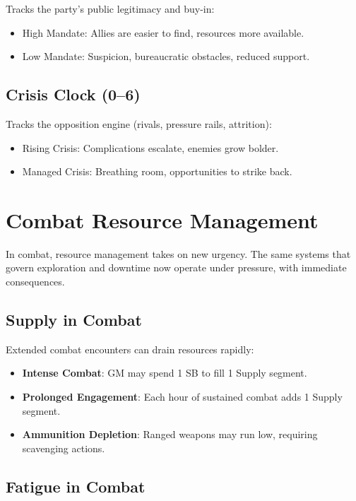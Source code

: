 Tracks the party's public legitimacy and buy-in:
\begin{itemize}
    \item High Mandate: Allies are easier to find, resources more available.
    \item Low Mandate: Suspicion, bureaucratic obstacles, reduced support.
\end{itemize}

\subsection*{Crisis Clock (0--6)}

Tracks the opposition engine (rivals, pressure rails, attrition):
\begin{itemize}
    \item Rising Crisis: Complications escalate, enemies grow bolder.
    \item Managed Crisis: Breathing room, opportunities to strike back.
\end{itemize}

\section*{Combat Resource Management}

In combat, resource management takes on new urgency. The same systems that govern exploration and downtime now operate under pressure, with immediate consequences.

\subsection*{Supply in Combat}

Extended combat encounters can drain resources rapidly:

\begin{itemize}
    \item \textbf{Intense Combat}: GM may spend 1 SB to fill 1 Supply segment.
    \item \textbf{Prolonged Engagement}: Each hour of sustained combat adds 1 Supply segment.
    \item \textbf{Ammunition Depletion}: Ranged weapons may run low, requiring scavenging actions.
\end{itemize}

\subsection*{Fatigue in Combat}

